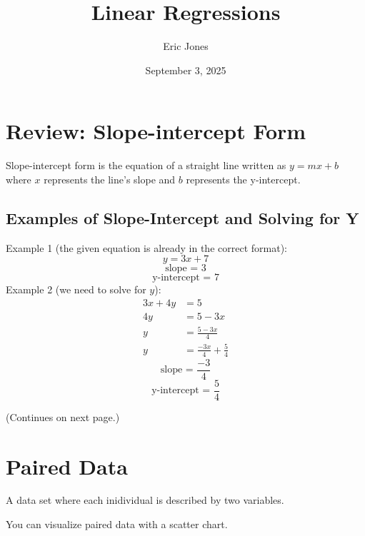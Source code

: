 \documentclass{article}
\title{Linear Regressions}
\author{Eric Jones}
\date{September 3, 2025}
\begin{document}
    

\maketitle                   

\section{Review: Slope-intercept Form}      
Slope-intercept form is the equation of a straight line written as \(y = mx + b\) where \(x\) represents the line's slope and \(b\) represents the y-intercept.

\subsection{Examples of Slope-Intercept and Solving for Y}
Example 1 (the given equation is already in the correct format):
\[y = 3x + 7\]
\vspace{-1.5em}
\[\text{slope = $3$}\]
\vspace{-1.5em}
\[\text{y-intercept = $7$}\]
\vspace{1em}
\noindent Example 2 (we need to solve for $y$):
\[
\begin{aligned}
3x + 4y &= 5 \\
4y &= 5 - 3x \\
y &= \frac{5 - 3x}{4} \\
y &= \frac{-3x}{4} + \frac{5}{4}
\end{aligned}
\]
\vspace{-0.5em}
\vspace{0.5em}
\[\text{slope = $\frac{-3}{4}$}\]
\vspace{-1em}
\[\text{y-intercept = $\frac{5}{4}$}\]
\vfill
\begin{center}
       (Continues on next page.)
\end{center}

\newpage
\section{Paired Data}
A data set where each inidividual is described by two variables.

\noindent You can visualize paired data with a scatter chart.

\begin{center}
\end{center}
\end{document}
